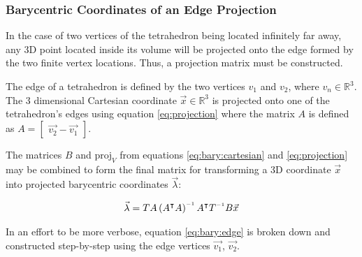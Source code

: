 \subsubsection{Barycentric Coordinates of an Edge Projection}

In the case of two vertices of the  tetrahedron  being  located  infinitely  far
away, any 3D point located inside its volume will  be  projected  onto  the edge
formed by the two  finite  vertex  locations.  Thus, a projection matrix must be
constructed.

The edge of  a tetrahedron is defined by the two vertices $v_1$ and $v_2$, where
$v_n    \in    \mathbb{R}^3$.    The   3   dimensional   Cartesian    coordinate
$\vec{x}\in\mathbb{R}^3$  is projected onto one of the tetrahedron's edges using
equation  \ref{eq:projection}  where  the  matrix  $A$   is   defined  as  $A  =
\begin{bmatrix} \vec{v_2} - \vec{v_1} \end{bmatrix}$.

The matrices $B$ and $\text{proj}_V$ from equations \ref{eq:bary:cartesian}  and
\ref{eq:projection} may be combined to form the final matrix  for transforming a
3D coordinate $\vec{x}$ into projected
barycentric coordinates $\vec{\lambda}$:

\begin{align}
    \label{eq:bary:edge}
    \vec{\lambda} = TA\left(A\transpose A\right)\inverse A\transpose T\inverse B \vec{x}
\end{align}

In an effort to be more verbose, equation \ref{eq:bary:edge} is broken down  and
constructed  step-by-step  using  the  edge  vertices  $\vec{v_1}$, $\vec{v_2}$.

